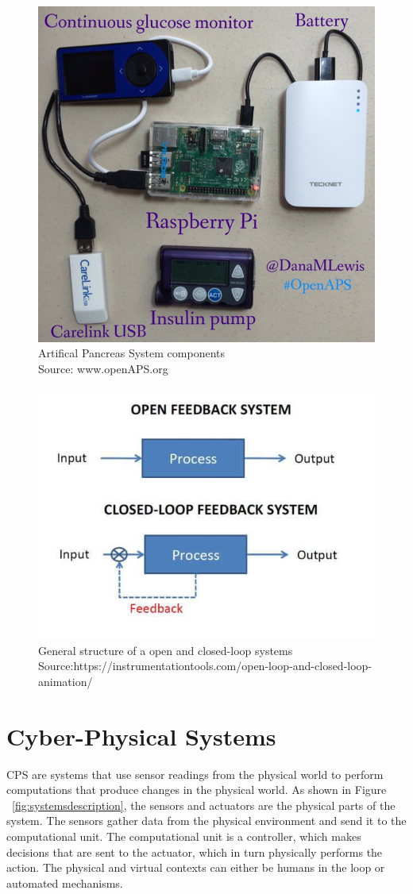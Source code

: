 \begin{figure}
	\centering
	\includegraphics[width=0.7\linewidth]{Images/APSrig}
	\caption{Artifical Pancreas System components \\
		Source: www.openAPS.org}
	\label{fig:apsrig}
\end{figure}



\begin{figure}
	\centering
	\includegraphics[width=0.7\linewidth]{Images/closedvsopen}
	\caption{General structure of a open and closed-loop systems 
		Source:https://instrumentationtools.com/open-loop-and-closed-loop-animation/ }
	\label{fig:closedvsopen}
\end{figure}


\section{Cyber-Physical Systems}
\ac{CPS} are systems that use sensor readings from the physical world to perform computations that produce changes in the physical  world.   
As shown in Figure ~\ref{fig:systemsdescription}, the sensors and actuators are the physical parts of the system. 
The sensors gather data from the physical environment and send it to the computational unit. 
The computational unit is a controller, which makes decisions that are sent to the actuator, which in turn  physically performs the action.
The physical and virtual contexts can either be humans in the loop or automated mechanisms.

